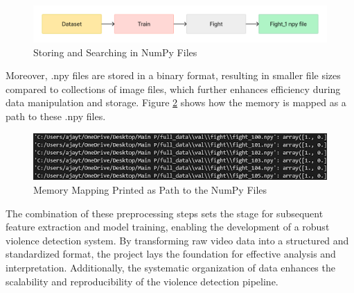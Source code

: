     \begin{figure}[h!]
        \centering
        \includegraphics[width=1\linewidth]{Images/With npy.png}
        \caption{Storing and Searching in NumPy Files}
        \label{processnumpy}
    \end{figure}

    \noindent Moreover, .npy files are stored in a binary format, resulting in smaller file sizes compared to collections of image files, which further enhances efficiency during data manipulation and storage. Figure \ref{memorymap} shows how the memory is mapped as a path to these .npy files.
    
    \begin{figure}[h!]
        \centering
        \includegraphics[width=0.9\linewidth]{Images/Mem map.png}
        \caption{Memory Mapping Printed as Path to the NumPy Files}
        \label{memorymap}
    \end{figure}

\noindent The combination of these preprocessing steps sets the stage for subsequent feature extraction and model training, enabling the development of a robust violence detection system. By transforming raw video data into a structured and standardized format, the project lays the foundation for effective analysis and interpretation. Additionally, the systematic organization of data enhances the scalability and reproducibility of the violence detection pipeline.


\clearpage



